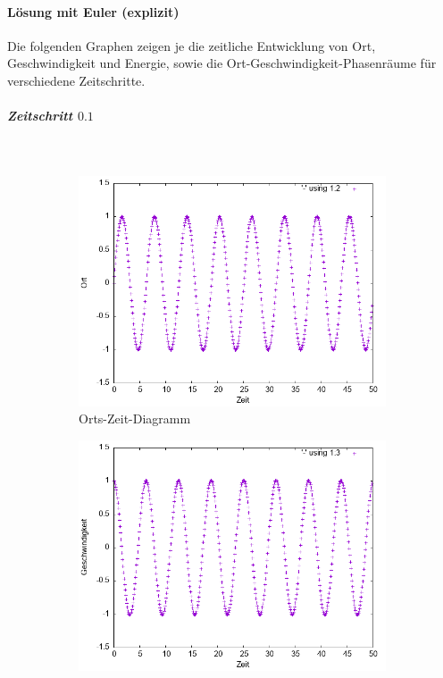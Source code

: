 \documentclass[
    oneside,
    ngerman,
    footinclude=false,
    captions=tableheading,
    DIV=12
]{scrartcl}
\begin{document}
    \aufgabe{}
        \subaufgabe{}
            \paragraph*{Lösung mit Euler (explizit)}
                Die folgenden Graphen zeigen je die zeitliche Entwicklung von Ort, Geschwindigkeit und Energie, sowie die Ort-Geschwindigkeit-Phasenräume für verschiedene Zeitschritte.     

                \subparagraph*{Zeitschritt $0.1$}\,
                \begin{figure}[H]
                    \centering
                    \begin{subfigure}[b]{0.45\textwidth}
                        \centering
                        \includegraphics[width=\textwidth]{Bilddateien/expEulerA1(a)-01-0-x.png}
                        \caption{Orts-Zeit-Diagramm}
                        \label{fig:expEulerA1(a)-01-0-x}
                    \end{subfigure}
                    \hfill
                    \begin{subfigure}[b]{0.45\textwidth}
                        \centering
                        \includegraphics[width=\textwidth]{Bilddateien/expEulerA1(a)-01-0-v.png}

\end{subfigure}
\end{figure}
\end{document}
